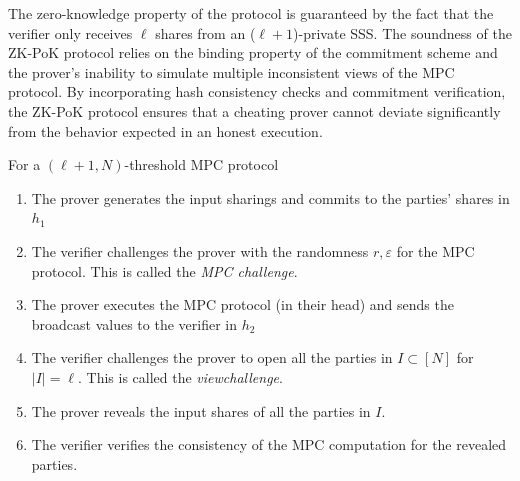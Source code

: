 \documentclass[11pt]{report}
\theoremstyle{definition}
\theoremstyle{plain}
\begin{document}
The zero-knowledge property of the protocol is guaranteed by the fact that the verifier only receives $\ell$ shares from an ($\ell + 1$)-private SSS.
The soundness of the ZK-PoK protocol relies on the binding property of the commitment scheme and the prover's inability to simulate multiple inconsistent views of the MPC protocol. By incorporating hash consistency checks and commitment verification, the ZK-PoK protocol ensures that a cheating prover cannot deviate significantly from the behavior expected in an honest execution.

\clearpage
\begin{protocol}
  \label{pro:sdith-zkpok}
  For a $(\ell + 1, N)$-threshold MPC protocol
  \begin{enumerate}[parsep=0pt, itemsep=0pt, topsep=0pt]
    \item The prover generates the input sharings and commits to the parties' shares in $h_1$
    \item The verifier challenges the prover with the randomness \(r, \varepsilon\) for the MPC protocol. This is called the \textit{MPC challenge}.
    \item The prover executes the MPC protocol (in their head) and sends the broadcast values to the verifier in $h_2$
    \item The verifier challenges the prover to open all the parties in \(I \subset [N]\) for $|I| = \ell$. This is called the \textit{viewchallenge}.
    \item The prover reveals the input shares of all the parties in \(I\).
    \item The verifier verifies the consistency of the MPC computation for the revealed parties.
  \end{enumerate}
\end{protocol}
\end{document}
